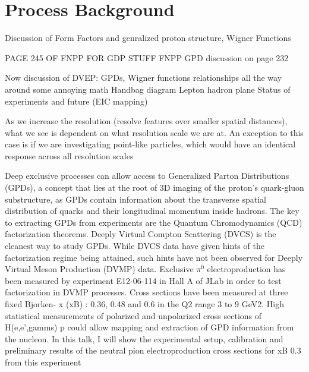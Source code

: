 
\section{Process Background}
    Discussion of Form Factors and genralized proton structure, Wigner Functions

PAGE 245 OF FNPP FOR GDP STUFF
        FNPP GPD discussion on page 232
        
    Now discussion of DVEP:
GPDs, Wigner functions
relationships all the way around
some annoying math
Handbag diagram
Lepton hadron plane
Status of experiments and future (EIC mapping)

        As we increase the resolution (resolve features over smaller spatial distances), what we see is dependent on what resolution scale we are at. An exception to this case is if we are investigating point-like particles, which would have an identical response across all resolution scales


Deep exclusive processes can allow access to Generalized Parton Distributions (GPDs),
a concept that lies at the root of 3D imaging of the proton’s quark-gluon substructure,
as GPDs contain information about the transverse spatial distribution of quarks and their
longitudinal momentum inside hadrons. The key to extracting GPDs from experiments are
the Quantum Chromodynamics (QCD) factorization theorems. Deeply Virtual Compton
Scattering (DVCS) is the cleanest way to
study GPDs. While DVCS data have given hints of the factorization regime being
attained, such hints have not been observed for Deeply Virtual Meson Production (DVMP)
data. Exclusive $\pi^0$ electroproduction has been measured by experiment E12-06-114 in Hall
A of JLab in order to test factorization in DVMP processes. Cross sections have been
measured at three fixed Bjorken- x (xB) : 0.36, 0.48 and 0.6 in the Q2 range 3 to 9 GeV2.
High statistical measurements of polarized and unpolarized cross sections of H(e,e’,gamms)
p could allow mapping and extraction of GPD information from the nucleon. In this talk,
I will show the experimental setup, calibration and preliminary results of the neutral pion
electroproduction cross sections for xB 0.3 from this experiment


